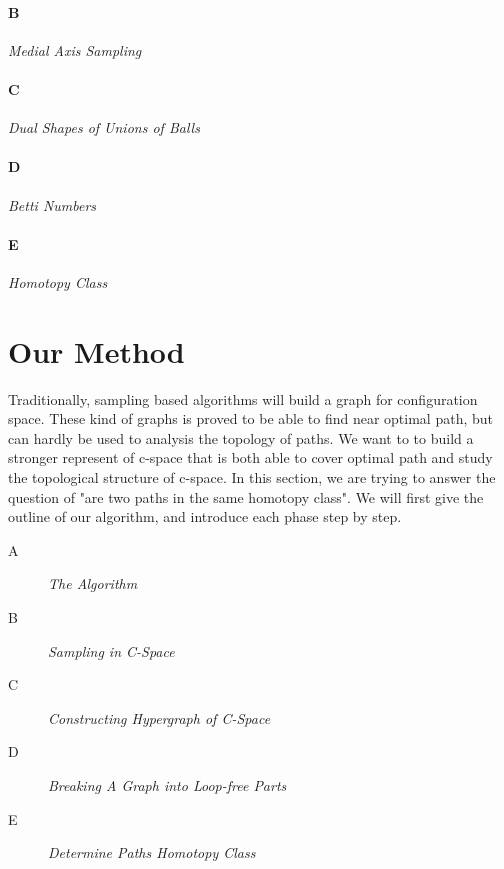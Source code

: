 \documentclass[11pt]{article}
\begin{document}
\paragraph{B} \emph{Medial Axis Sampling} \hfill \\

\paragraph{C} \emph{Dual Shapes of Unions of Balls} \hfill\\

\paragraph{D} \emph{Betti Numbers} \hfill \\

\paragraph{E} \emph{Homotopy Class} \hfill \\


\section{Our Method}\label{method}

\indent \indent Traditionally, sampling based algorithms will build a graph for configuration space. These kind of graphs is proved to be able to find near optimal path, but can hardly be used to analysis the topology of paths. We want to to build a stronger represent of c-space that is both able to cover optimal path and study the topological structure of c-space. In this section, we are trying to answer the question of "are two paths in the same homotopy class". We will first give the outline of our algorithm, and introduce each phase step by step. 

\begin{description}

\item[A] \emph{The Algorithm} \hfill \\

\item[B] \emph{Sampling in C-Space} \hfill \\

\item[C] \emph{Constructing Hypergraph of C-Space} \hfill \\

\item[D] \emph{Breaking A Graph into Loop-free Parts} \hfill\\

\item[E] \emph{Determine Paths Homotopy Class} \hfill \\

\end{description}
\end{document}
